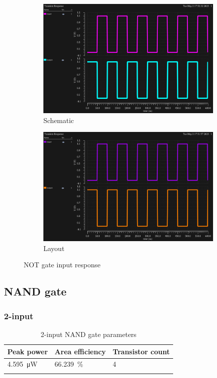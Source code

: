 \begin{figure}[H]
    \begin{subfigure}{0.48\textwidth}
        \includegraphics[width=\textwidth]{./figures/inverter/plot-schematic.png}
        \caption{Schematic}\label{fig:notplotschematic}
    \end{subfigure}
    \hfill
    \begin{subfigure}{0.48\textwidth}
        \includegraphics[width=\textwidth]{./figures/inverter/plot-layout.png}
        \caption{Layout}\label{fig:notplotlayout}
    \end{subfigure}
    \caption{NOT gate input response}
\end{figure}
\clearpage

\subsection{NAND gate}
\subsubsection{2-input}
    \begin{xltabular}{\textwidth}{YYY}
        \hline
        Peak power & Area efficiency & Transistor count \\
        \hline
        \qty{4.595}{\uW} & \qty{66.239}{\percent} & 4 \\
        \hline    
        \caption{2-input NAND gate parameters}
    \end{xltabular}

